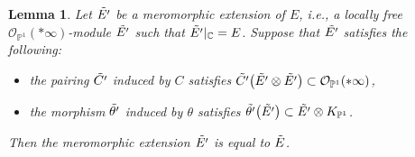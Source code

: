 \documentclass[10pt,a4paper]{amsart}
\numberwithin{equation}{section}
\newtheorem{Lemma}[Theorem]{Lemma}
\newcommand{\C}{\mathbb{C}}
\newcommand{\ps}{\mathbb{P}}
\newcommand{\strsheaf}{\mathcal{O}}
\begin{document}
\begin{Lemma}\label{mero_unique}
 Let $\Tilde{E'}$ be a meromorphic extension of $E$, i.e., a locally free $\strsheaf_{\ps^1}(*\infty)$-module $\Tilde{E'}$ such that $\Tilde{E'}|_{\C} = E$. Suppose that $\Tilde{E'}$ satisfies the following:
 \begin{itemize}\itemsep=0pt
 \item the pairing $\Tilde{C'}$ induced by $C$ satisfies $\Tilde{C'}\bigl(\Tilde{E'}\otimes \Tilde{E'}\bigr)\subset \strsheaf_{\ps^1}(*\infty)$,
 \item the morphism $\Tilde{\theta '}$ induced by $\theta$ satisfies $\Tilde{\theta'}\bigl(\Tilde{E'}\bigr)\subset \Tilde{E'}\otimes K_{\ps^1}$.
 \end{itemize}
 Then the meromorphic extension $\Tilde{E'}$ is equal to $\Tilde{E}$.
\end{Lemma}
\end{document}
